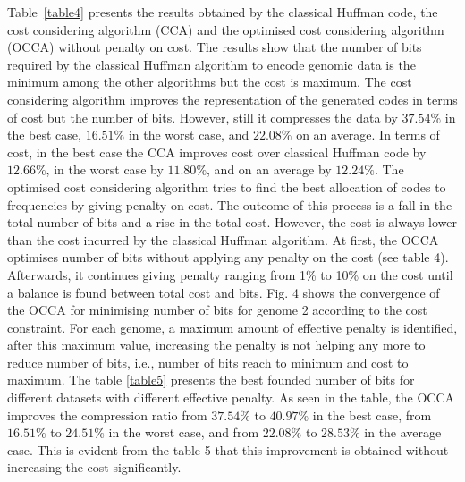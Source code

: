 \documentclass[preprint,12pt]{elsarticle}%
\begin{document}
Table~\ref{table4} presents the results obtained by the classical Huffman code, the cost considering algorithm (CCA) and the optimised cost considering algorithm (OCCA) without penalty on cost. The results show that the number of bits required by the classical Huffman algorithm to encode genomic data is the minimum among the other algorithms but the cost is  maximum. The cost considering algorithm improves the representation of the generated codes in terms of cost but the number of bits. However, still it compresses the data by $37.54\%$ in the best case, $16.51\%$ in the worst case, and $22.08\%$ on an average. In terms of cost, in the best case the CCA improves cost over classical Huffman code by $12.66\%$, in the worst case by $11.80\%$, and on an average by $12.24\%$.  The optimised cost considering algorithm tries to find the best allocation of codes to frequencies by giving penalty on cost. The outcome of this process is a fall in the total number of bits and a rise in the total cost. However, the cost is always lower than the cost incurred by the classical Huffman algorithm.  At first, the OCCA optimises number of bits without applying any penalty on the cost (see table 4). Afterwards, it continues giving penalty ranging from 1\% to 10\% on the cost  until a balance is found between total cost and bits. Fig. 4 shows the convergence of the OCCA for minimising number of bits for genome 2 according to the cost constraint. For each genome, a maximum amount of effective penalty is identified, after this maximum value, increasing the penalty is not helping any more to reduce number of bits, i.e., number of bits reach to minimum and cost to maximum.  The table \ref{table5} presents the best founded number of bits for different datasets with different effective penalty. As seen in the table, the OCCA improves the compression ratio from $37.54\%$ to $40.97\%$ in the best case, from $16.51\%$ to $24.51\%$ in the worst case, and from $22.08\%$ to $28.53\%$ in the average case. This is evident from the table 5 that this improvement is obtained without increasing the cost significantly.    %
\end{document}
